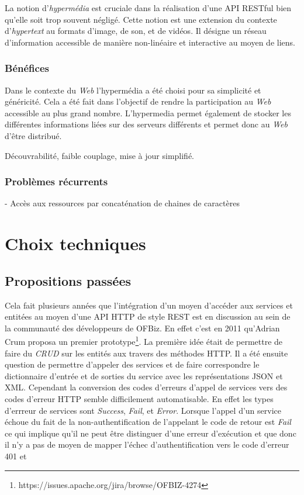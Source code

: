 \documentclass[a4paper, 11pt]{report}
\begin{document}
La notion d'\emph{hypermédia} est cruciale dans la réalisation d'une
API RESTful bien qu'elle soit trop souvent négligé.  Cette notion est
une extension du contexte d'\emph{hypertext} au formats d'image, de
son, et de vidéos.  Il désigne un réseau d'information accessible de
manière non-linéaire et interactive au moyen de liens.

\subsection{Bénéfices}

Dans le contexte du \emph{Web} l'hypermédia a été choisi pour sa
simplicité et généricité.  Cela a été fait dans l'objectif de rendre
la participation au \emph{Web} accessible au plus grand nombre.
L'hypermedia permet également de stocker les différentes informations
liées sur des serveurs différents et permet donc au \emph{Web} d'être
distribué.

Découvrabilité, faible couplage, mise à jour simplifié.

\subsection{Problèmes récurrents}

- Accès aux ressources par concaténation de chaines de caractères

\chapter{Choix techniques}

\section{Propositions passées}

Cela fait plusieurs années que l'intégration d'un moyen d'accéder aux
services et entitées au moyen d'une API HTTP de style REST est en
discussion au sein de la communauté des développeurs de OFBiz.  En
effet c'est en 2011 qu'Adrian Crum proposa un premier
prototype\footnote{https://issues.apache.org/jira/browse/OFBIZ-4274}. La
première idée était de permettre de faire du \emph{CRUD} sur les
entités aux travers des méthodes HTTP.  Il a été ensuite question de
permettre d'appeler des services et de faire correspondre le
dictionnaire d'entrée et de sorties du service avec les
représentations JSON et XML.  Cependant la conversion des codes
d'erreurs d'appel de services vers des codes d'erreur HTTP semble
difficilement automatisable.  En effet les types d'errreur de services
sont \emph{Success}, \emph{Fail}, et \emph{Error}.  Lorsque l'appel
d'un service échoue du fait de la non-authentification de l'appelant
le code de retour est \emph{Fail} ce qui implique qu'il ne peut être
distinguer d'une erreur d'exécution et que donc il n'y a pas de moyen
de mapper l'échec d'authentification vers le code d'erreur 401  et
\end{document}
